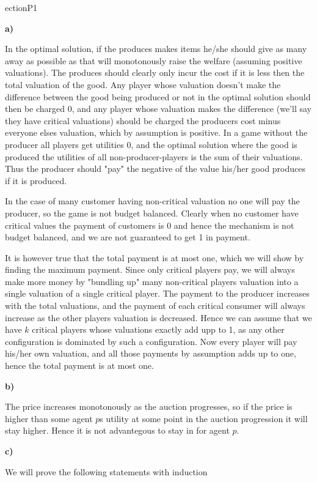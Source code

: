 ection{P1}

\textbf{a)}

In the optimal solution, if the produces makes items he/she should give as many away as possible as that will monotonously raise the welfare (assuming positive valuations). The produces should clearly only incur the cost if it is less then the total valuation of the good. Any player whose valuation doesn't make the difference between the good being produced or not in the optimal solution should then be charged 0, and any player whose valuation makes the difference (we'll say they have critical valuations) should be charged the producers cost minus everyone elses valuation, which by assumption is positive. In a game without the producer all players get utilities 0, and the optimal solution where the good is produced the utilities of all non-producer-players is the sum of their valuations. Thus the producer should "pay" the negative of the value his/her good produces if it is produced.

In the case of many customer having non-critical valuation no one will pay the producer, so the game is not budget balanced. Clearly when no customer have critical values the payment of customers is 0 and hence the mechanism is not budget balanced, and we are not guaranteed to get 1 in payment.

It is however true that the total payment is at most one, which we will show by finding the maximum payment. Since only critical players pay, we will always make more money by "bundling up" many non-critical players valuation into a single valuation of a single critical player. The payment to the producer increases with the total valuations, and the payment of each critical consumer will always increase as the other players valuation is decreased. Hence we can assume that we have $k$ critical players whose valuations exactly add upp to 1, as any other configuration is dominated by such a configuration. Now every player will pay his/her own valuation, and all those payments by assumption adds up to one, hence the total payment is at most one.

\textbf{b)}

The price increases monotonously as the auction progresses, so if the price is higher than some agent $p$s utility at some point in the auction progression it will stay higher. Hence it is not advantegous to stay in for agent $p$.

\textbf{c)}

We will prove the following statements with induction

